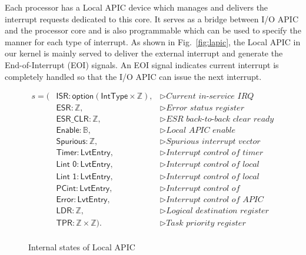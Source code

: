 Each processor has a Local APIC device which manages and delivers the interrupt
requests dedicated to this core. It serves as a bridge between I/O APIC and the
processor core and is also programmable which can be used to specify the manner
for each type of interrupt. As shown in Fig.~\ref{fig:lapic}, the Local APIC in
our kernel is mainly served to deliver the external interrupt and generate the
End-of-Interrupt (EOI) signals. An EOI signal indicates current interrupt is
completely handled so that the I/O APIC can issue the next interrupt.

\begin{figure}
	\begin{center}
		\[
		\begin{array}{lll}
		s = ( & \mathsf{ISR}: \textsf{option} (\textsf{IntType} \times \mathbb{Z}), & \vartriangleright \textit{Current in-service IRQ} \\
		& \textsf{ESR}: \mathbb{Z}, & \vartriangleright \textit{Error status register} \\
		& \textsf{ESR\_CLR}: \mathbb{Z}, & \vartriangleright \textit{ESR back-to-back clear ready} \\
		& \textsf{Enable}: \mathbb{B}, & \vartriangleright \textit{Local APIC enable} \\
		& \textsf{Spurious}: \mathbb{Z}, & \vartriangleright \textit{Spurious interrupt vector} \\
		& \textsf{Timer}: \textsf{LvtEntry}, & \vartriangleright \textit{Interrupt control of timer} \\
		& \textsf{Lint~0}: \textsf{LvtEntry}, & \vartriangleright \textit{Interrupt control of local connected I/O devices on line 0} \\
		& \textsf{Lint~1}: \textsf{LvtEntry}, & \vartriangleright \textit{Interrupt control of local connected I/O devices on line 1} \\
		& \textsf{PCint}: \textsf{LvtEntry}, & \vartriangleright \textit{Interrupt control of performance counter} \\
		& \textsf{Error}: \textsf{LvtEntry}, & \vartriangleright \textit{Interrupt control of APIC internal error} \\
		& \textsf{LDR}: \mathbb{Z}, & \vartriangleright \textit{Logical destination register} \\
		& \textsf{TPR}: \mathbb{Z} \times \mathbb{Z}). & \vartriangleright \textit{Task priority register} \\
		\end{array}
		\]
	\end{center}
	\caption{Internal states of Local APIC}
	\label{fig:lapic-states}
\end{figure}

